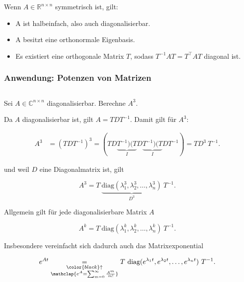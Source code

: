 \vspace{0.5\baselineskip}

Wenn \( A \in \mathbb{R}^{n \times n} \)  symmetrisch ist, gilt:

\begin{itemize}
    \item A ist halbeinfach, also auch diagonalisierbar.
    \item A besitzt eine orthonormale Eigenbasis.
    \item Es existiert eine orthogonale Matrix \( T \), sodass \( T^{-1} A T = T^\top A T \) diagonal ist.
\end{itemize}

\subsubsection{Anwendung: Potenzen von Matrizen} \( \ \)

\vspace{0.5\baselineskip}

Sei \( A \in \mathbb{C}^{n \times n} \) diagonalisierbar. Berechne \( A^3 \). 

\vspace{1\baselineskip}

Da \( A \) diagonalisierbar ist, gilt \( A = T D T^{-1} \). Damit gilt für \( A^3 \):

\begin{equation*}
    \begin{aligned}
        A^3 &= (T D T^{-1})^3 = (T D \underbrace{T^{-1}) (T}_{I} D \underbrace{T^{-1}) (T}_{I} D T^{-1}) = T D^3 \ T^{-1}.
    \end{aligned}
\end{equation*} 

und weil \( D \) eine Diagonalmatrix ist, gilt

\begin{equation*}
    A^3 = T \ \underbrace{ \text{diag}(\lambda_1^3, \lambda_2^3, \dots, \lambda_n^3)}_{D^3} \ T^{-1}.
\end{equation*}

Allgemein gilt für jede diagonalisierbare Matrix \( A \)

\begin{equation*}
    A^k = T \ \text{diag}(\lambda_1^k, \lambda_2^k, \dots, \lambda_n^k) \ T^{-1}.
\end{equation*}

Insbesondere vereinfacht sich dadurch auch das Matrixexponential

\begin{equation*}
    e^{At} \underset{\substack{\color{black}\uparrow \\
                       \mathclap{e^A = \sum_{m=0}^{\infty} \frac{A^m}{m!}}}}{=}T \ \text{diag}(e^{\lambda_1 t}, e^{\lambda_2 t}, \dots, e^{\lambda_n t}) \ T^{-1}.
\end{equation*} 
